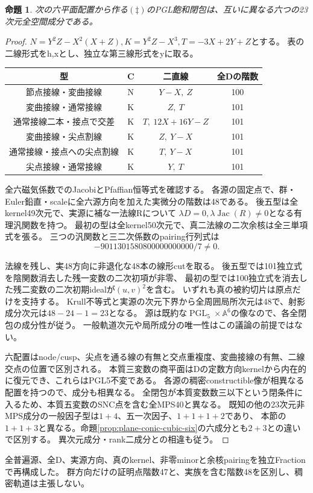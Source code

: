 \documentclass[a4paper,11pt]{ltjsarticle}
\newtheorem{proposition}{命題}[section]
\theoremstyle{definition}
\newcommand{\PGL}{\operatorname{PGL}}
\begin{document}
\begin{proposition}\label{prop:plane-two-lines-cubic-six}
次の六平面配置から作る$(\ddagger)$のPGL飽和閉包は、互いに異なる六つの23次元全空間成分である。
\end{proposition}
\begin{proof}
$N=Y^2Z-X^2(X+Z),K=Y^2Z-X^3,T=-3X+2Y+Z$とする。
表の二線形式をh,xとし、独立な第三線形式をyに取る。
\begin{center}\small
\begin{tabular}{c|c|c|c}
型&C&二直線&全Dの階数\\\hline
節点接線・変曲接線&N&$Y-X,\ Z$&100\\
変曲接線・通常接線&K&$Z,\ T$&101\\
通常接線二本・接点で交差&K&$T,\ 12X+16Y-Z$&101\\
変曲接線・尖点割線&K&$Z,\ Y-X$&101\\
通常接線・接点への尖点割線&K&$T,\ Y-X$&101\\
尖点接線・通常接線&K&$Y,\ T$&101
\end{tabular}
\end{center}
全六磁気係数でのJacobiとPfaffian恒等式を確認する。
各源の固定点で、群・Euler鉛直・scaleに全六源方向を加えた実微分の階数は48である。
後五型は全kernel49次元で、実源に補な一法線Rについて
$\lambda D=0,\lambda\operatorname{Jac}(R)\ne0$となる有理汎関数を持つ。
最初の型は全kernel50次元で、真二法線の二次余核は全三単項式を張る。
三つの汎関数と三二次係数のpairing行列式は
\[
 -9011301580800000000000/7\ne0.
\]

法線を残し、実48方向に非退化な48本の線形cutを取る。
後五型では101独立式を陰関数消去した残一変数の二次初項が非零、
最初の型では100独立式を消去した残二変数の二次初期idealが$(u,v)^2$を含む。
いずれも真の被約切片は原点だけを支持する。
Krull不等式と実源の次元下界から全周囲局所次元は48で、射影成分次元は$48-24-1=23$となる。
源は既約な$\PGL_5\times\mathbb A^6$の像なので、各全閉包の成分性が従う。
一般軌道次元や局所成分の唯一性はこの議論の前提ではない。

六配置はnode/cusp、尖点を通る線の有無と交点重複度、変曲接線の有無、二線交点の位置で区別される。
本質三変数の商平面はDの定数方向kernelから内在的に復元でき、これらはPGL5不変である。
各源の稠密constructible像が相異なる配置を持つので、成分も相異なる。
全閉包が本質変数数三以下という閉条件に入るため、本質五変数のSNC点を含む全MPS40と異なる。
既知の他の23次元非MPS成分の一般因子型は$1+4$、五一次因子、$1+1+1+2$であり、
本節の$1+1+3$と異なる。命題\ref{prop:plane-conic-cubic-six}の六成分とも$2+3$との違いで区別する。
異次元成分・rank二成分との相違も従う。
\end{proof}
全普遍源、全D、実源方向、真のkernel、非零minorと余核pairingを独立Fractionで再構成した。
群方向だけの証明点階数47と、実族を含む階数48を区別し、稠密軌道は主張しない。
\end{document}
